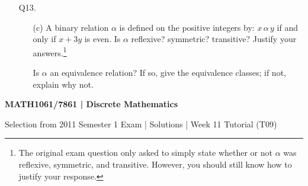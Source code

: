 \documentclass[a4paper,11pt]{article}
\newcommand{\Z}{\mathbb{Z}}
\newcommand{\ceil}[1]{\left \lceil #1 \right \rceil}
\begin{document}
\begin{enumerate}
\item[Q13.]
\begin{enumerate}
\item[(c)]
A binary relation $\alpha$ is defined on the
positive integers by: $x \, \alpha \, y$ if and only if $x+3y$ is even.
Is $\alpha$ reflexive? symmetric? transitive? Justify your answers.\footnote{The
original exam question only asked to simply state whether or not $\alpha$ was
reflexive, symmetric, and transitive. However, you should still know how to
justify your response.}

Is $\alpha$ an equivalence relation?
If so, give the equivalence classes; if not, explain why not.
\end{enumerate}

\end{enumerate}

\newpage

\begin{center}
\bf
MATH1061/7861 | Discrete Mathematics

Selection from 2011 Semester 1 Exam | Solutions | Week 11 Tutorial (T09)
\end{center}
\end{document}
